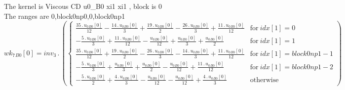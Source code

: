 \documentclass{article}
\begin{document}
\noindent The kernel is Viscous CD u0_B0 xi1 xi1 , block is 0\\\noindent The ranges are 0,block0np0,0,block0np1\\\begin{dmath}{wk_{7}{_{B0}}}[{0}] = inv_3 \,.\, \left(\begin{cases} \frac{35 \,.\, {u_{0}{_{B0}}}[{0}]}{12} - \frac{14 \,.\, {u_{0}{_{B0}}}[{0}]}{3} + \frac{19 \,.\, {u_{0}{_{B0}}}[{0}]}{2} - \frac{26 \,.\, {u_{0}{_{B0}}}[{0}]}{3} + \frac{11 \,.\, 
{u_{0}{_{B0}}}[{0}]}{12} & \text{for}\: {idx}[{1}] = 0 \\- \frac{5 \,.\, {u_{0}{_{B0}}}[{0}]}{3} + \frac{11 \,.\, {u_{0}{_{B0}}}[{0}]}{12} - \frac{{u_{0}{_{B0}}}[{0}]}{12} + \frac{{u_{0}{_{B0}}}[{0}]}{3} + \frac{{u_{0}{_{B0}}}[{0}]}{2} & \text{for}\: 
{idx}[{1}] = 1 \\\frac{35 \,.\, {u_{0}{_{B0}}}[{0}]}{12} + \frac{19 \,.\, {u_{0}{_{B0}}}[{0}]}{2} - \frac{26 \,.\, {u_{0}{_{B0}}}[{0}]}{3} - \frac{14 \,.\, {u_{0}{_{B0}}}[{0}]}{3} + \frac{11 \,.\, {u_{0}{_{B0}}}[{0}]}{12} & \text{for}\: {idx}[{1}] = 
block0np1 - 1 \\- \frac{5 \,.\, {u_{0}{_{B0}}}[{0}]}{3} + \frac{{u_{0}{_{B0}}}[{0}]}{3} + \frac{{u_{0}{_{B0}}}[{0}]}{2} - \frac{{u_{0}{_{B0}}}[{0}]}{12} + \frac{11 \,.\, {u_{0}{_{B0}}}[{0}]}{12} & \text{for}\: {idx}[{1}] = block0np1 - 2 \\- \frac{5 
\,.\, {u_{0}{_{B0}}}[{0}]}{2} + \frac{4 \,.\, {u_{0}{_{B0}}}[{0}]}{3} - \frac{{u_{0}{_{B0}}}[{0}]}{12} - \frac{{u_{0}{_{B0}}}[{0}]}{12} + \frac{4 \,.\, {u_{0}{_{B0}}}[{0}]}{3} & \text{otherwise} \end{cases}\right)\end{dmath}
\end{document}
